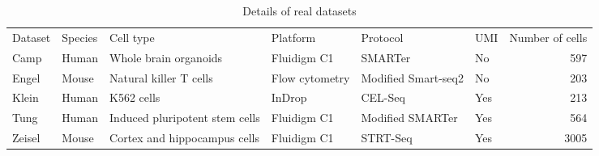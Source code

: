 \begin{table}
\caption{\label{tab:datasets}Details of real datasets}
\begin{tabular}[t]{l l l l l l r}
Dataset & Species & Cell type & Platform & Protocol & UMI & Number of cells\\
Camp \cite{Camp_2015} & Human & Whole brain organoids & Fluidigm C1 & SMARTer & No & 597\\
Engel \cite{Engel_2016} & Mouse & Natural killer T cells & Flow cytometry & Modified Smart-seq2 & No & 203\\
Klein \cite{Klein_2015} & Human & K562 cells & InDrop & CEL-Seq & Yes & 213\\
Tung \cite{Tung_2017} & Human & Induced pluripotent stem cells & Fluidigm C1 & Modified SMARTer & Yes & 564\\
Zeisel \cite{Zeisel_2015} & Mouse & Cortex and hippocampus cells & Fluidigm C1 & STRT-Seq & Yes & 3005\\
\end{tabular}
\end{table}